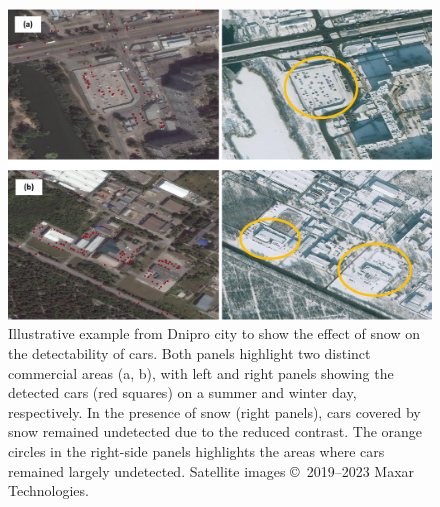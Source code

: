 \documentclass[sn-basic]{sn-jnl}%
\begin{document}
{\begin{appendices}
\begin{figure}[htbp]
\begin{center}
\includegraphics[width=\textwidth]{Figures/SnowEffect_final.pdf}
\end{center}
\caption{Illustrative example from Dnipro city to show the effect of snow on the detectability of cars. Both panels highlight two distinct commercial areas (a, b), with left and right panels showing the detected cars (red squares) on a summer and winter day, respectively. In the presence of snow (right panels), cars covered by snow remained undetected due to the reduced contrast. The orange circles in the right-side panels highlights the areas where cars remained largely undetected. Satellite images \copyright ~2019--2023 Maxar Technologies.
}
\label{figSM_SnowEffect}
\end{figure}



\end{appendices}}
\end{document}

